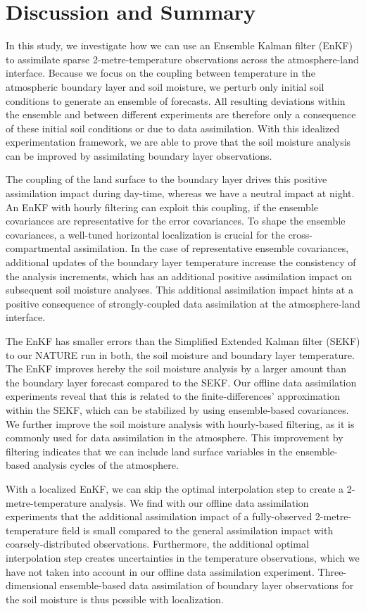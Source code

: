 \documentclass[HESSD, manuscript]{copernicus}
\begin{document}
\section{Discussion and Summary}

In this study, we investigate how we can use an Ensemble Kalman filter (EnKF) to assimilate sparse 2-metre-temperature observations across the atmosphere-land interface.
Because we focus on the coupling between temperature in the atmospheric boundary layer and soil moisture, we perturb only initial soil conditions to generate an ensemble of forecasts.
All resulting deviations within the ensemble and between different experiments are therefore only a consequence of these initial soil conditions or due to data assimilation.
With this idealized experimentation framework, we are able to prove that
the soil moisture analysis can be improved by assimilating boundary layer observations.

The coupling of the land surface to the boundary layer drives this positive assimilation impact during day-time, whereas we have a neutral impact at night.
An EnKF with hourly filtering can exploit this coupling, if the ensemble covariances are representative for the error covariances.
To shape the ensemble covariances, a well-tuned horizontal localization is crucial for the cross-compartmental assimilation.
In the case of representative ensemble covariances, additional updates of the boundary layer temperature increase the consistency of the analysis increments, which has an additional positive assimilation impact on subsequent soil moisture analyses.
This additional assimilation impact hints at a positive consequence of strongly-coupled data assimilation at the atmosphere-land interface.

The EnKF has smaller errors than the Simplified Extended Kalman filter (SEKF) to our NATURE run in both, the soil moisture and boundary layer temperature.
The EnKF improves hereby the soil moisture analysis by a larger amount than the boundary layer forecast compared to the SEKF.
Our offline data assimilation experiments reveal that this is related to the finite-differences' approximation within the SEKF, which can be stabilized by using ensemble-based covariances.
We further improve the soil moisture analysis with hourly-based filtering, as it is commonly used for data assimilation in the atmosphere.
This improvement by filtering indicates that we can include land surface variables in the ensemble-based analysis cycles of the atmosphere.

With a localized EnKF, we can skip the optimal interpolation step to create a 2-metre-temperature analysis.
We find with our offline data assimilation experiments that the additional assimilation impact of a fully-observed 2-metre-temperature field is small compared to the general assimilation impact with coarsely-distributed observations.
Furthermore, the additional optimal interpolation step creates uncertainties in the temperature observations, which we have not taken into account in our offline data assimilation experiment.
Three-dimensional ensemble-based data assimilation of boundary layer observations for the soil moisture is thus possible with localization.
\end{document}
